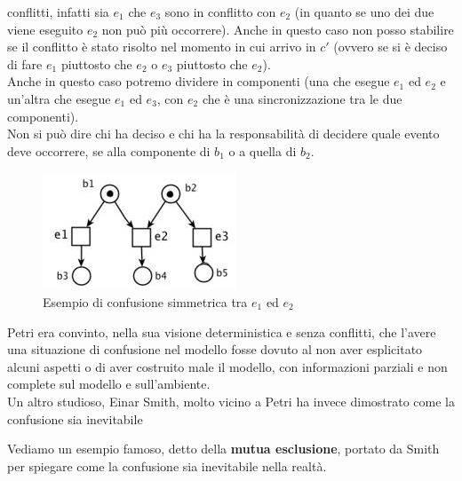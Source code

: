 \documentclass[a4paper,12pt, oneside]{book}
\begin{document}
\begin{definizione}
\begin{enumerate}
    conflitti, infatti sia $e_1$ che $e_3$ sono in conflitto con $e_2$ (in
    quanto se uno dei due viene eseguito $e_2$ non può più occorrere). Anche in
    questo caso non posso stabilire se il conflitto è stato risolto nel momento
    in cui arrivo in $c'$ (ovvero se si è deciso di fare $e_1$ piuttosto che
    $e_2$ o $e_3$ piuttosto che $e_2$).\\
    Anche in questo caso potremo dividere in componenti (una che esegue $e_1$ ed
    $e_2$ e un'altra che esegue $e_1$ ed $e_3$, con $e_2$ che è una
    sincronizzazione tra le due componenti).\\
    Non si può dire chi ha deciso e chi ha la responsabilità di decidere quale
    evento deve occorrere, se alla componente di $b_1$ o a quella di $b_2$.\\
    \begin{figure}[H]
      \centering
      \includegraphics[scale = 0.7]{img/confu2.jpg}
      \caption{Esempio di confusione simmetrica tra $e_1$ ed $e_2$} 
    \end{figure}
  \end{enumerate}
  Petri era convinto, nella sua visione deterministica e senza conflitti, che
  l'avere una situazione di confusione nel modello fosse dovuto al non aver
  esplicitato alcuni aspetti o di aver costruito male il modello, con
  informazioni parziali e non complete sul modello e sull'ambiente.\\
  Un altro studioso, Einar Smith, molto vicino a Petri ha invece dimostrato come la
  confusione sia inevitabile
\end{definizione}
Vediamo un esempio famoso, detto della \textbf{mutua esclusione}, portato da
Smith per spiegare come la confusione sia inevitabile nella realtà.
\end{document}
